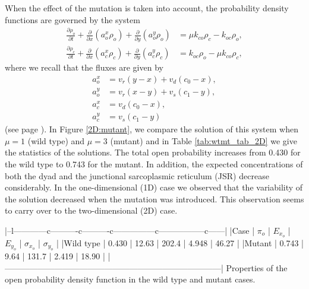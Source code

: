 {When the effect of the mutation is taken into account, the probability density functions are governed by the system 
\begin{align}
\frac{\partial\rho_{o}}{\partial t}+\frac{\partial}{\partial x}\left(
a_{o}^{x}\rho_{o}\right)  +\frac{\partial}{\partial y}\left(  a_{o}^{y}
\rho_{o}\right)   &  =\mu k_{co}\rho_{c}-k_{oc}\rho_{o},\label{eq:pdf211}\\
\frac{\partial\rho_{c}}{\partial t}+\frac{\partial}{\partial x}\left(
a_{c}^{x}\rho_{c}\right)  +\frac{\partial}{\partial y}\left(  a_{c}^{y}
\rho_{c}\right)   &  =k_{oc}\rho_{o}-\mu k_{co}\rho_{c},\label{eq:pdf212}
\end{align}
where we recall that the fluxes are given by
\begin{align}
a_{o}^{x} &  =v_{r}\left(  y-x\right)  +v_{d}\left(  c_{0}-x\right)
,\nonumber\\
a_{o}^{y} &  =v_{r}\left(  x-y\right)  +v_{s}\left(  c_{1}-y\right)
,\label{eq:fluxes2D}\\
a_{c}^{x} &  =v_{d}\left(  c_{0}-x\right)  ,\nonumber\\
a_{c}^{y} &  =v_{s}\left(  c_{1}-y\right) \nonumber
\end{align}
(see page \pageref{eq:pdf21}).
In Figure \ref{2D:mutant}, we compare the solution of this system when $\mu=1$ (wild type)
and $\mu=3$ (mutant) and in Table \ref{tab:wtmt_tab_2D} we give the statistics of the solutions. The total 
open probability increases from 0.430 for the wild type to 0.743 for the mutant. In addition, the expected concentrations
of both the dyad and the junctional sarcoplasmic reticulum (JSR) decrease considerably. In the one-dimensional (1D) case we observed that the variability of the solution decreased when the mutation was introduced. This observation seems to carry over to the two-dimensional (2D) case.



|--l------------c----------c----------c---------------c-----------------c------|
|Case      | $\pi_o$ | $E_{x_o}$ | $E_{y_o}$ | $\sigma_{x_o}$ | $\sigma_{y_o}$ |
|Wild type | 0.430   | 12.63     | 202.4     | 4.948          | 46.27          |
|Mutant    | 0.743   | 9.64      | 131.7     | 2.419          | 18.90          |
|------------------------------------------------------------------------------| 
Properties of the open probability density function in the
wild type and mutant cases. \label{tab:wtmt_tab_2D}




}
